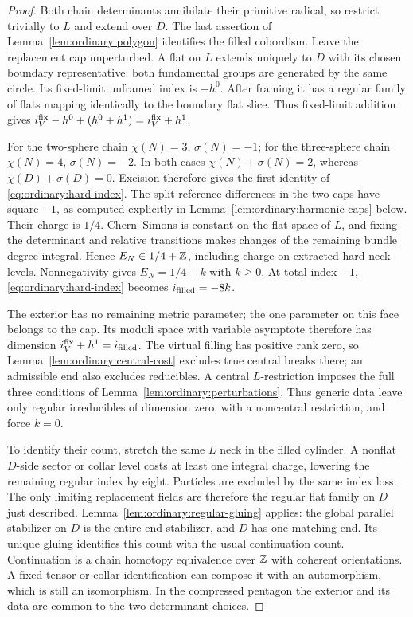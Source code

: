 \begin{proof}
Both chain determinants annihilate their primitive radical, so
restrict trivially to $L$ and extend over $D$.  The last assertion
of Lemma~\ref{lem:ordinary:polygon} identifies the filled
cobordism.  Leave the replacement cap unperturbed.  A flat on
$L$ extends uniquely to $D$ with its chosen boundary
representative: both fundamental groups are generated by the
same circle.  Its fixed-limit unframed index is $-h^0$.
After framing it has a regular family of flats mapping
identically to the boundary flat slice.  Thus fixed-limit
addition gives
$i_V^{\rm fix}-h^0+(h^0+h^1)=i_V^{\rm fix}+h^1$.

For the two-sphere chain $\chi(N)=3$, $\sigma(N)=-1$;
for the three-sphere chain $\chi(N)=4$, $\sigma(N)=-2$.
In both cases $\chi(N)+\sigma(N)=2$, whereas
$\chi(D)+\sigma(D)=0$.  Excision therefore gives the first
identity of \eqref{eq:ordinary:hard-index}.  The split
reference differences in the two caps have square $-1$,
as computed explicitly in
Lemma~\ref{lem:ordinary:harmonic-caps} below.  Their charge
is $1/4$.  Chern--Simons is constant on the flat space of
$L$, and fixing the determinant and relative transitions
makes changes of the remaining bundle degree integral.
Hence $E_N\in1/4+\mathbb Z$, including charge on extracted hard-neck
levels.  Nonnegativity gives $E_N=1/4+k$ with $k\ge0$.
At total index $-1$, \eqref{eq:ordinary:hard-index} becomes
$i_{\rm filled}=-8k$.

The exterior has no remaining metric parameter; the one
parameter on this face belongs to the cap.  Its moduli space
with variable asymptote therefore has dimension
$i_V^{\rm fix}+h^1=i_{\rm filled}$.  The virtual filling
has positive rank zero, so
Lemma~\ref{lem:ordinary:central-cost} excludes true central
breaks there; an admissible end also excludes reducibles.
A central $L$-restriction imposes the full three conditions
of Lemma~\ref{lem:ordinary:perturbations}.  Thus generic data
leave only regular irreducibles of dimension zero, with a
noncentral restriction, and force $k=0$.

To identify their count, stretch the same $L$ neck in the
filled cylinder.  A nonflat $D$-side sector or collar level
costs at least one integral charge, lowering the remaining
regular index by eight.  Particles are excluded by the same
index loss.  The only limiting replacement fields are
therefore the regular flat family on $D$ just described.
Lemma~\ref{lem:ordinary:regular-gluing} applies: the global
parallel stabilizer on $D$ is the entire end stabilizer,
and $D$ has one matching end.  Its unique gluing identifies
this count with the usual continuation count.  Continuation
is a chain homotopy equivalence over $\mathbb Z$ with coherent
orientations.  A fixed tensor or collar identification can
compose it with an automorphism, which is still an
isomorphism.  In the compressed pentagon the exterior and
its data are common to the two determinant choices.
\end{proof}


